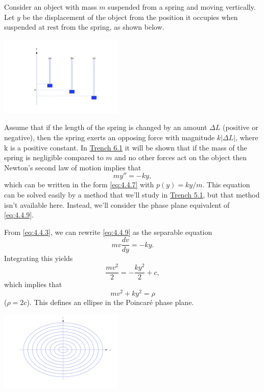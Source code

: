 \documentclass{ximera}
\begin{document}
\begin{example}\label{example:4.4.1}
 Consider an object with mass $m$ suspended from a
spring and moving vertically. Let $y$ be the displacement of the
object from the position it occupies when suspended at rest from the
spring, as shown below.
 
\begin{image}
 \includegraphics[height=1.5in]{fig040402.jpg}
\end{image}
 
Assume that if the length of the spring is changed by an amount
$\Delta L$ (positive or negative), then the spring exerts an opposing
force with magnitude $k|\Delta L|$, where k is a positive constant. In \href{https://ximera.osu.edu/ode/main/springProblemsI/springProblemsI}{Trench 6.1} it will be shown that if the mass of the spring
is negligible compared to $m$ and no other forces act on the object then
Newton's second law of motion implies that
\begin{equation} \label{eq:4.4.9}
my''=-ky,
\end{equation}
which can be written in the form \eqref{eq:4.4.7} with $p(y)=ky/m$. This
equation can be solved easily by a method that we'll study in
 \href{https://ximera.osu.edu/ode/main/constantCoefficientHomogeneousEquations/constantCoefficientHomogeneousEquations}{Trench 5.1}, but that method isn't available here. Instead,
we'll consider the phase plane equivalent of \eqref{eq:4.4.9}.
 
From \eqref{eq:4.4.3}, we can rewrite \eqref{eq:4.4.9} as the separable
equation
$$
 mv\frac{dv}{dy}=-ky.
$$
Integrating this  yields
$$
\frac{mv^2}{2}=-\frac{ky^2}{2}+c,
$$
which implies that
\begin{equation} \label{eq:4.4.10}
mv^2+ky^2=\rho
\end{equation}
($\rho=2c$). This defines an ellipse in the Poincar\'e phase plane.
 
 
\begin{image}
 \includegraphics[height=1.5in]{fig040403.jpg}
\end{image}
 

\end{example}
\end{document}
